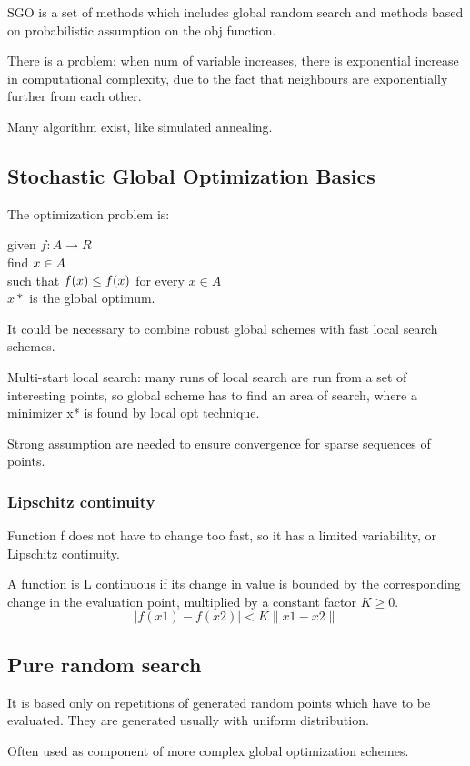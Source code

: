 \documentclass[10pt]{article}
\begin{document}
SGO is a set of methods which includes global random search and methods based on probabilistic assumption on the obj function. 

There is a problem: when num of variable increases, there is exponential increase in computational complexity, due to the fact that neighbours are exponentially further from each other.
 
Many algorithm exist, like simulated annealing.

\subsection{Stochastic Global Optimization Basics}
The optimization problem is:

given $ f : A \rightarrow R $ \\
find $ x\* \in A $ \\
such that $ f(x\*) \leq f(x) $ for every $ x \in A $ \\

$ x\ast $ is the global optimum.

It could be necessary to combine robust global schemes with fast local search schemes.

Multi-start local search: many runs of local search are run from a set of interesting points, so global scheme has to find an area of search, where a minimizer x* is found by local opt technique.

Strong assumption are needed to ensure convergence for sparse sequences of points. 

\subsubsection{Lipschitz continuity}
Function f does not have to change too fast, so it has a limited variability, or Lipschitz continuity. 

A function is L continuous if its change in value is bounded by the corresponding change in the evaluation point, multiplied by a constant factor $ K \geq 0 $.
$$
\mid f(x1)-f(x2) \mid < K \parallel x1 - x2 \parallel
$$ 

\subsection{Pure random search}
It is based only on repetitions of generated random points which have to be evaluated. They are generated usually with uniform distribution. 

Often used as component of more complex global optimization schemes. 
\end{document}
